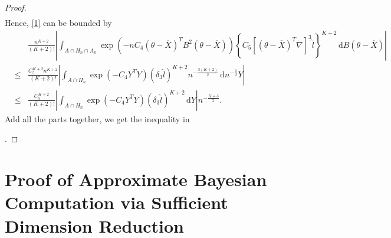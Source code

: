 \documentclass[oneside,english]{amsbook}
\numberwithin{section}{chapter}
\numberwithin{equation}{section}
\numberwithin{figure}{section}
\theoremstyle{plain}
\theoremstyle{plain}
\theoremstyle{definition}
\theoremstyle{plain}
\theoremstyle{plain}
\theoremstyle{remark}
\theoremstyle{definition}
\theoremstyle{definition}
\newcommand{\diff}{\,\mathrm{d}}
\begin{document}
\begin{proof}
\begin{eqnarray*}
\end{eqnarray*}
Hence, \eqref{1} can be bounded by 
\begin{eqnarray*}
 &  & \frac{n^{K+2}}{\left(K+2\right)!}\left|\int_{A\cap H_{n}\cap A_{n}}\exp\left(-nC_{4}\left(\theta-\overline{X}\right)^{T}B^{2}\left(\theta-\overline{X}\right)\right)\left\{ C_{5}\left[\left(\theta-\overline{X}\right)^{T}\nabla\right]^{3}\hat{l}\right\} ^{K+2}\diff B\left(\theta-\overline{X}\right)\right|\\
 & \le & \frac{C_{5}^{K+2}n^{K+2}}{\left(K+2\right)!}\left|\int_{A\cap H_{n}}\exp\left(-C_{4}Y^{T}Y\right)\left(\delta_{3}\hat{l}\right)^{K+2}n^{-\frac{3\left(K+2\right)}{2}}\diff n^{-\frac{1}{2}}Y\right|\\
 & \le & \frac{C_{5}^{K+2}}{\left(K+2\right)!}\left|\int_{A\cap H_{n}}\exp\left(-C_{4}Y^{T}Y\right)\left(\delta_{3}\hat{l}\right)^{K+2}\diff Y\right|n^{-\frac{K+3}{2}}.
\end{eqnarray*}
Add all the parts together, we get the inequality in %

.
\end{proof}

\chapter{Proof of Approximate Bayesian Computation via Sufficient Dimension
Reduction}
\end{document}
